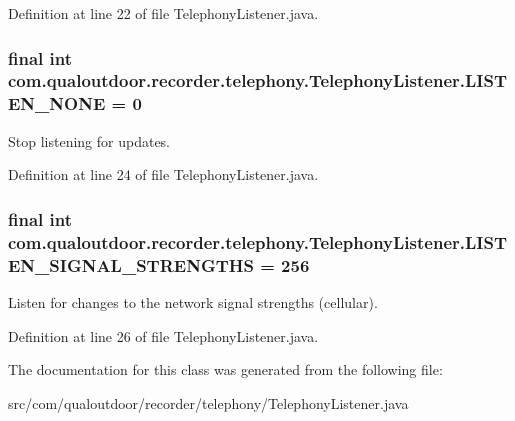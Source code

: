 Definition at line 22 of file Telephony\-Listener.\-java.

\hypertarget{classcom_1_1qualoutdoor_1_1recorder_1_1telephony_1_1TelephonyListener_a5d217cc158268f8c01738b0f51e1ce53}{
\subsubsection[{L\-I\-S\-T\-E\-N\-\_\-\-N\-O\-N\-E}]{\setlength{\rightskip}{0pt plus 5cm}final int com.\-qualoutdoor.\-recorder.\-telephony.\-Telephony\-Listener.\-L\-I\-S\-T\-E\-N\-\_\-\-N\-O\-N\-E = 0\hspace{0.3cm}{\ttfamily [static]}}}\label{classcom_1_1qualoutdoor_1_1recorder_1_1telephony_1_1TelephonyListener_a5d217cc158268f8c01738b0f51e1ce53}
Stop listening for updates. 

Definition at line 24 of file Telephony\-Listener.\-java.

\hypertarget{classcom_1_1qualoutdoor_1_1recorder_1_1telephony_1_1TelephonyListener_aab3f3a875e74a3b4d6eab7db23683372}{
\subsubsection[{L\-I\-S\-T\-E\-N\-\_\-\-S\-I\-G\-N\-A\-L\-\_\-\-S\-T\-R\-E\-N\-G\-T\-H\-S}]{\setlength{\rightskip}{0pt plus 5cm}final int com.\-qualoutdoor.\-recorder.\-telephony.\-Telephony\-Listener.\-L\-I\-S\-T\-E\-N\-\_\-\-S\-I\-G\-N\-A\-L\-\_\-\-S\-T\-R\-E\-N\-G\-T\-H\-S = 256\hspace{0.3cm}{\ttfamily [static]}}}\label{classcom_1_1qualoutdoor_1_1recorder_1_1telephony_1_1TelephonyListener_aab3f3a875e74a3b4d6eab7db23683372}
Listen for changes to the network signal strengths (cellular). 

Definition at line 26 of file Telephony\-Listener.\-java.



The documentation for this class was generated from the following file\-:\begin{DoxyCompactItemize}
\item 
src/com/qualoutdoor/recorder/telephony/Telephony\-Listener.\-java\end{DoxyCompactItemize}

